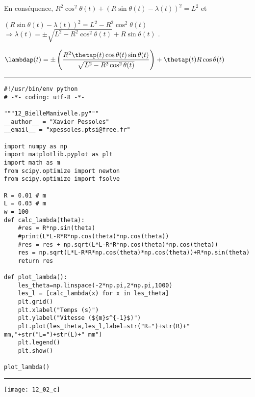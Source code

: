 En conséquence, 
$R^2\cos^2\theta(t)  + \left(R\sin\theta(t)  - \lambda(t)\right)^2 = L^2$ et 

$ \left(R\sin\theta(t)  - \lambda(t)\right)^2 = L^2 - R^2\cos^2\theta(t) $ 
$\Rightarrow    \lambda(t) = \pm\sqrt{L^2 - R^2\cos^2\theta(t)} + R\sin\theta(t) $ .
\else
\fi

\ifprof

$\lambdap(t) = \pm\left( \dfrac{R^2 \thetap(t) \cos\theta(t)\sin\theta(t)}{\sqrt{L^2 - R^2\cos^2\theta(t)}}\right) + \thetap(t)R\cos\theta(t) $ 

\else
\fi


\ifprof
\noindent\hrule
\begin{lstlisting}
#!/usr/bin/env python
# -*- coding: utf-8 -*-

"""12_BielleManivelle.py"""
__author__ = "Xavier Pessoles"
__email__ = "xpessoles.ptsi@free.fr"

import numpy as np
import matplotlib.pyplot as plt
import math as m
from scipy.optimize import newton
from scipy.optimize import fsolve

R = 0.01 # m
L = 0.03 # m
w = 100
def calc_lambda(theta):
    #res = R*np.sin(theta)
    #print(L*L-R*R*np.cos(theta)*np.cos(theta))
    #res = res + np.sqrt(L*L-R*R*np.cos(theta)*np.cos(theta))
    res = np.sqrt(L*L-R*R*np.cos(theta)*np.cos(theta))+R*np.sin(theta)
    return res

def plot_lambda():
    les_theta=np.linspace(-2*np.pi,2*np.pi,1000)
    les_l = [calc_lambda(x) for x in les_theta]
    plt.grid()
    plt.xlabel("Temps (s)")
    plt.ylabel("Vitesse (${m}s^{-1}$)")
    plt.plot(les_theta,les_l,label=str("R=")+str(R)+" mm,"+str("L=")+str(L)+" mm")
    plt.legend()
    plt.show()
    
plot_lambda()
\end{lstlisting}
\noindent\hrule

\begin{center}
\texttt{[image: 12\_02\_c]}
\end{center}
\else
\fi


